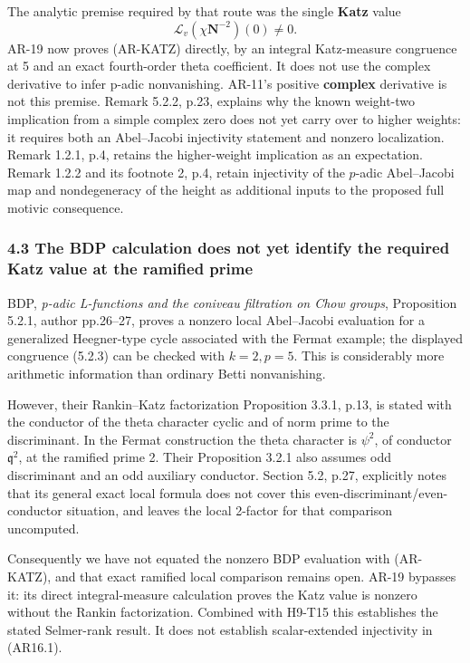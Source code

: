 The analytic premise required by that route was the single \textbf{Katz}
value \[
\mathcal L_v(\chi\mathbf N^{-2})(0)\ne0.
\tag{AR-KATZ}
\] AR-19 now proves (AR-KATZ) directly, by an integral Katz-measure
congruence at 5 and an exact fourth-order theta coefficient. It does not
use the complex derivative to infer p-adic nonvanishing. AR-11's
positive \textbf{complex} derivative is not this premise. Remark 5.2.2,
p.23, explains why the known weight-two implication from a simple
complex zero does not yet carry over to higher weights: it requires both
an Abel--Jacobi injectivity statement and nonzero localization. Remark
1.2.1, p.4, retains the higher-weight implication as an expectation.
Remark 1.2.2 and its footnote 2, p.4, retain injectivity of the
\(p\)-adic Abel--Jacobi map and nondegeneracy of the height as
additional inputs to the proposed full motivic consequence.

\subsubsection{4.3 The BDP calculation does not yet identify the
required Katz value at the ramified
prime}\label{the-bdp-calculation-does-not-yet-identify-the-required-katz-value-at-the-ramified-prime}

BDP, \emph{p-adic L-functions and the coniveau filtration on Chow
groups}, Proposition 5.2.1, author pp.26--27, proves a nonzero local
Abel--Jacobi evaluation for a generalized Heegner-type cycle associated
with the Fermat example; the displayed congruence (5.2.3) can be checked
with \(k=2,p=5\). This is considerably more arithmetic information than
ordinary Betti nonvanishing.

However, their Rankin--Katz factorization Proposition 3.3.1, p.13, is
stated with the conductor of the theta character cyclic and of norm
prime to the discriminant. In the Fermat construction the theta
character is \(\psi^2\), of conductor \(\mathfrak q^2\), at the ramified
prime 2. Their Proposition 3.2.1 also assumes odd discriminant and an
odd auxiliary conductor. Section 5.2, p.27, explicitly notes that its
general exact local formula does not cover this
even-discriminant/even-conductor situation, and leaves the local
2-factor for that comparison uncomputed.

Consequently we have not equated the nonzero BDP evaluation with
(AR-KATZ), and that exact ramified local comparison remains open. AR-19
bypasses it: its direct integral-measure calculation proves the Katz
value is nonzero without the Rankin factorization. Combined with H9-T15
this establishes the stated Selmer-rank result. It does not establish
scalar-extended injectivity in (AR16.1).

